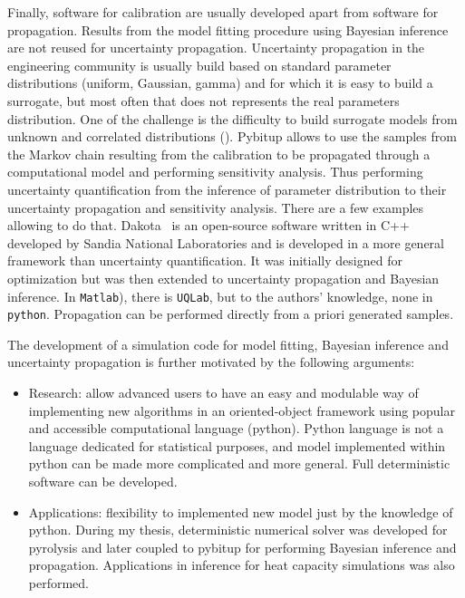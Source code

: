 \documentclass[a4paper,11pt]{article}
\begin{document}
Finally, software for calibration are usually developed apart from software for propagation. Results from the model fitting procedure using  Bayesian inference are not reused for uncertainty propagation. Uncertainty propagation in the engineering community is usually build based on standard parameter distributions (uniform, Gaussian, gamma) and for which it is easy to build a surrogate, but most often that does not represents the real parameters distribution. One of the challenge is the difficulty to build surrogate models from unknown and correlated distributions (\cite{Jakeman_2019}). Pybitup allows to use the samples from the Markov chain resulting from the calibration to be propagated through a computational model and performing sensitivity analysis. Thus performing uncertainty quantification from the inference of parameter distribution to their uncertainty propagation and sensitivity analysis. There are a few examples allowing to do that. Dakota~\cite{dakota_6_10} is an open-source software written in C++ developed by Sandia National Laboratories and is developed in a more general framework than uncertainty quantification. It was initially designed for optimization but was then extended to uncertainty propagation and Bayesian inference. In \texttt{Matlab}), there is \texttt{UQLab}, but to the authors' knowledge, none in \texttt{python}. Propagation can be performed directly from a priori generated samples.  

The development of a simulation code for model fitting, Bayesian inference and uncertainty propagation is further motivated by the following arguments: 
\begin{itemize}
\item Research: allow advanced users to have an easy and modulable way of implementing new algorithms in an oriented-object framework using popular and accessible computational language (python). Python language is not a language dedicated for statistical purposes, and model implemented within python can be made more complicated and more general. Full deterministic software can be developed. 
\item Applications: flexibility to implemented new model just by the knowledge of python. During my thesis, deterministic numerical solver was developed for pyrolysis and later coupled to pybitup for performing Bayesian inference and propagation. Applications in inference for heat capacity simulations was also performed.   
\end{itemize}
\end{document}
